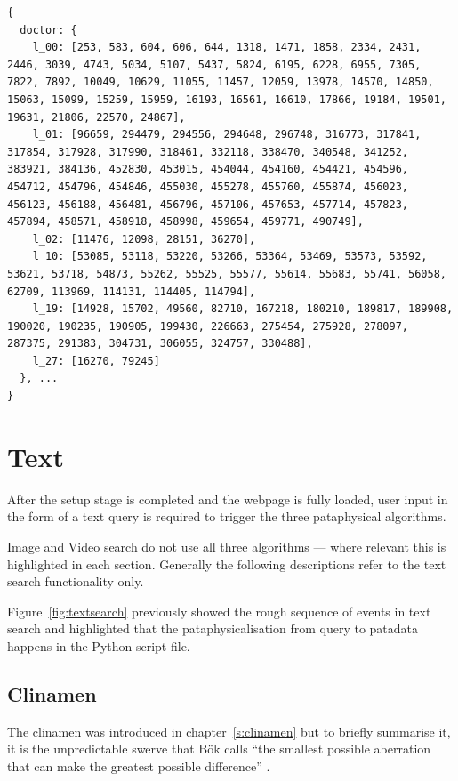 \label{c:pos}
\begin{verbatim}
{
  doctor: {
    l_00: [253, 583, 604, 606, 644, 1318, 1471, 1858, 2334, 2431, 2446, 3039, 4743, 5034, 5107, 5437, 5824, 6195, 6228, 6955, 7305, 7822, 7892, 10049, 10629, 11055, 11457, 12059, 13978, 14570, 14850, 15063, 15099, 15259, 15959, 16193, 16561, 16610, 17866, 19184, 19501, 19631, 21806, 22570, 24867],
    l_01: [96659, 294479, 294556, 294648, 296748, 316773, 317841, 317854, 317928, 317990, 318461, 332118, 338470, 340548, 341252, 383921, 384136, 452830, 453015, 454044, 454160, 454421, 454596, 454712, 454796, 454846, 455030, 455278, 455760, 455874, 456023, 456123, 456188, 456481, 456796, 457106, 457653, 457714, 457823, 457894, 458571, 458918, 458998, 459654, 459771, 490749],
    l_02: [11476, 12098, 28151, 36270],
    l_10: [53085, 53118, 53220, 53266, 53364, 53469, 53573, 53592, 53621, 53718, 54873, 55262, 55525, 55577, 55614, 55683, 55741, 56058, 62709, 113969, 114131, 114405, 114794],
    l_19: [14928, 15702, 49560, 82710, 167218, 180210, 189817, 189908, 190020, 190235, 190905, 199430, 226663, 275454, 275928, 278097, 287375, 291383, 304731, 306055, 324757, 330488],
    l_27: [16270, 79245]
  }, ...
}
\end{verbatim}


\section{Text}
\label{s:algorithms}

After the setup stage is completed and the webpage is fully loaded, user input in the form of a text query is required to trigger the three pataphysical algorithms.

Image and Video search do not use all three algorithms --- where relevant this is highlighted in each section. Generally the following descriptions refer to the text search functionality only.

Figure~\ref{fig:textsearch} previously showed the rough sequence of events in text search and highlighted that the pataphysicalisation from query to patadata happens in the  Python script file.


\subsection{Clinamen}
\label{s:clinamenalgo}

The clinamen was introduced in chapter~\ref{s:clinamen} but to briefly summarise it, it is the unpredictable swerve that Bök calls ``the smallest possible aberration that can make the greatest possible difference'' \citeyear{Boek2002}.

